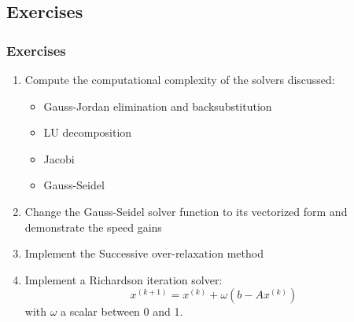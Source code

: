 \subsection*{Exercises}
\begin{frame}[fragile]
  \frametitle{Exercises}
  \begin{enumerate}
    \item Compute the computational complexity of the solvers discussed:
    \begin{itemize}
      \item Gauss-Jordan elimination and backsubstitution
      \item LU decomposition
      \item Jacobi
      \item Gauss-Seidel
    \end{itemize}
    \item Change the Gauss-Seidel solver function to its vectorized form and demonstrate the speed gains
    \item Implement the Successive over-relaxation method 
    \item Implement a Richardson iteration solver: 
      \[ x^{{(k+1)}}=x^{{(k)}}+\omega \left(b-Ax^{{(k)}}\right) \]
      with $\omega$ a scalar between 0 and 1.
  \end{enumerate}
\end{frame}